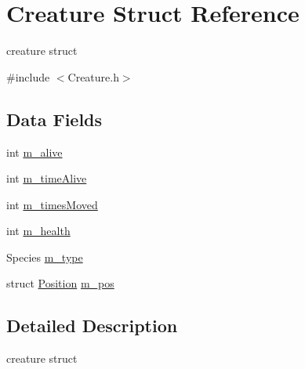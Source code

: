 \hypertarget{structCreature}{\section{\-Creature \-Struct \-Reference}
\label{structCreature}
}


creature struct  




{\ttfamily \#include $<$\-Creature.\-h$>$}

\subsection*{\-Data \-Fields}
\begin{DoxyCompactItemize}
\item 
int \hyperlink{structCreature_a8d083e8a98c019ef6d3317bebda5a552}{m\-\_\-alive}
\item 
int \hyperlink{structCreature_a490bf0cfa104604cebd15859e8f0c864}{m\-\_\-time\-Alive}
\item 
int \hyperlink{structCreature_ad3b63266be858ba31c0b5dbda49f8c37}{m\-\_\-times\-Moved}
\item 
int \hyperlink{structCreature_a7ee7518a06a266abff11add056aaf320}{m\-\_\-health}
\item 
\-Species \hyperlink{structCreature_aa0d3236cdcdd452525158e7240e80fac}{m\-\_\-type}
\item 
struct \hyperlink{structPosition}{\-Position} \hyperlink{structCreature_a6c2bfc56229ac81d02fc190b70c95529}{m\-\_\-pos}
\end{DoxyCompactItemize}


\subsection{\-Detailed \-Description}
creature struct 

